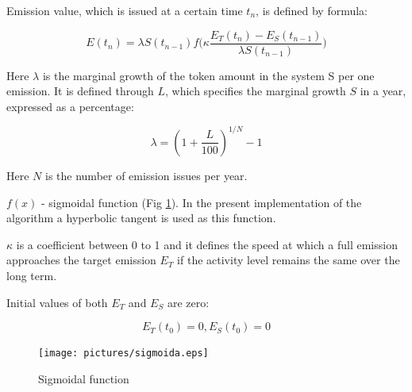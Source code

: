\documentclass[a4paper,12pt]{article}
\begin{document}
Emission value, which is issued at a certain time $t_n$, is defined by formula:


$$
    E(t_n) = \lambda S(t_{n-1}) f \Big( \kappa \frac {E_T(t_n) - E_S(t_{n-1})}{\lambda S(t_{n-1})} \Big)
$$

Here $\lambda$ is the marginal growth of the token amount in the system S per one emission. It is defined through $L$, which specifies the marginal growth $S$ in a year, expressed as a percentage:


$$
    \lambda = (1 + \frac{L}{100})^{1/N}-1
$$

Here $N$ is the number of emission issues per year.


$f(x)$ - sigmoidal function (Fig \ref{fig:sigmoida}). In the present implementation of the algorithm a hyperbolic tangent is used as this function. 


$\kappa$ is a coefficient between 0 to 1 and it defines the speed at which a full emission approaches the target emission $E_T$ if the activity level remains the same over the long term.


Initial values of both $E_T$ and $E_S$ are zero:


$$
E_T(t_0)=0, E_S(t_0)=0
$$


\begin{figure}[h]
      \texttt{[image: pictures/sigmoida.eps]}
      \caption{Sigmoidal function}
      \label{fig:sigmoida}
\end{figure}
\end{document}
